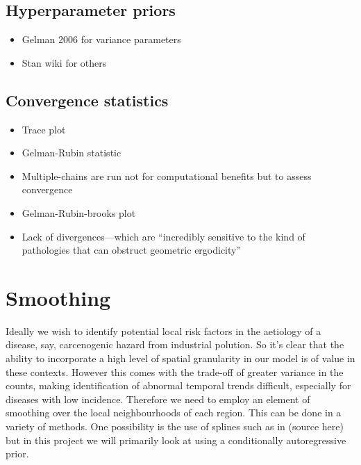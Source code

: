 \documentclass{article}
\begin{document}
\subsection{Hyperparameter priors}

\begin{itemize}

\item Gelman 2006 for variance parameters

\item Stan wiki for others

\end{itemize}

\subsection{Convergence statistics}

\begin{itemize}

\item Trace plot

\item Gelman-Rubin statistic

\item Multiple-chains are run not for computational benefits but to assess convergence

\item Gelman-Rubin-brooks plot

\item Lack of divergences---which are ``incredibly sensitive to the kind of pathologies that can obstruct geometric ergodicity'' 


\end{itemize}


\section{Smoothing}

Ideally we wish to identify potential local risk factors in the aetiology of a disease, say, carcenogenic hazard from industrial polution. So it's clear that the ability to incorporate a high level of spatial granularity in our model is of value in these contexts. However this comes with the trade-off of greater variance in the counts, making identification of abnormal temporal trends difficult, especially for diseases with low incidence. Therefore we need to employ an element of smoothing over the local neighbourhoods of each region. This can be done in a variety of methods. One possibility is the use of splines such as in (source here) but in this project we will primarily look at using a conditionally autoregressive prior.
\end{document}
